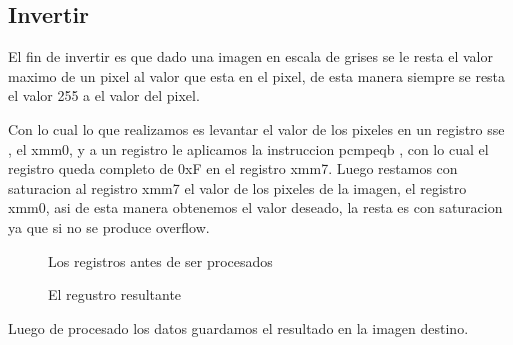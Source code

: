 \subsection{Invertir}
El fin de invertir es que dado una imagen en escala de grises se le resta el valor maximo de un pixel al valor que esta en el pixel, de esta manera siempre se resta el valor 255 a el valor del pixel.

Con lo cual lo que realizamos es levantar el valor de los pixeles en un registro sse , el xmm0, y a un registro le aplicamos la instruccion pcmpeqb , con lo cual el registro queda completo de 0xF en el registro xmm7.
Luego restamos con saturacion al registro xmm7 el valor de los pixeles de la imagen, el registro xmm0, asi de esta manera obtenemos el valor deseado, la resta es con saturacion ya que si no se produce overflow.

\begin{figure}[ht]
\caption{Los registros antes de ser procesados}
\end{figure}

\begin{figure}[ht]
\caption{El regustro resultante}
\end{figure}

Luego de procesado los datos guardamos el resultado en la imagen destino.
